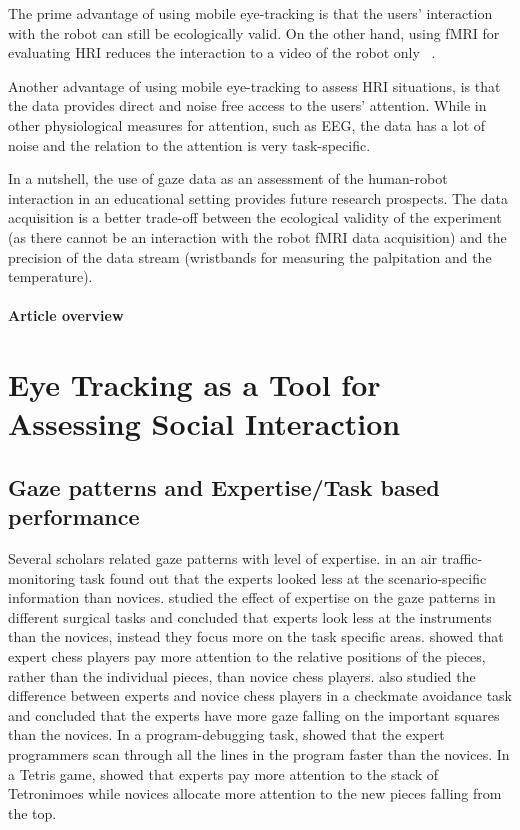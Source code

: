 \documentclass{sig-alternate}
\begin{document}
The prime advantage of using mobile eye-tracking is that the users' interaction
with the robot can still be ecologically valid. On the other hand, using fMRI
for evaluating HRI reduces the interaction to a video of the robot only
~\cite{rosenthal2013neural}.

Another advantage of using mobile eye-tracking to assess HRI situations, is that
the data provides direct and noise free access to the users' attention. While in
other physiological measures for attention, such as EEG, the data has a lot of
noise and the relation to the attention is very task-specific.


In a nutshell, the use of gaze data as an assessment of the human-robot
interaction in an educational setting provides future research
prospects. The data acquisition is a better trade-off between the
ecological validity of the experiment (as there cannot be an interaction
with the robot fMRI data acquisition) and the precision of the data
stream (wristbands for measuring the palpitation and the temperature).

\paragraph{Article overview}


\section{Eye Tracking as a Tool for Assessing Social Interaction}

\subsection{Gaze patterns and Expertise/Task based performance}

Several scholars related gaze patterns with level of expertise.
\cite{hasse2012measure} in an air traffic-monitoring task found out that the
experts looked less at the scenario-specific information than novices.
\cite{eivazi2012gaze, law2004eye, tien2010measuring} studied the effect of
expertise on the gaze patterns in different surgical tasks and concluded that
experts look less at the instruments than the novices, instead they focus more
on the task specific areas. \cite{reingold2001visual} showed that expert chess
players pay more attention to the relative positions of the pieces, rather than
the individual pieces, than novice chess players. \cite{blignaut2008visual} also
studied the difference between experts and novice chess players in a checkmate
avoidance task and concluded that the experts have more gaze falling on the
important squares than the novices. In a program-debugging task,
\cite{sharif2012eye} showed that the expert programmers scan through all the
lines in the program faster than the novices. In a Tetris game,
\cite{jermann2010using} showed that experts pay more attention to the stack of
Tetronimoes while novices allocate more attention to the new pieces falling from
the top.
\end{document}
